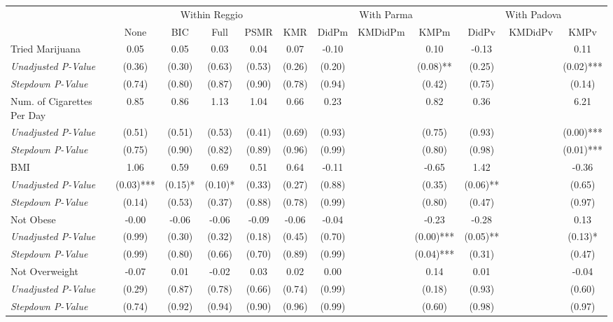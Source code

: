 \begin{tabular}{l c c c c c c c c c c c}
\toprule
& \multicolumn{5}{c}{Within Reggio} & \multicolumn{3}{c}{With Parma} & \multicolumn{3}{c}{With Padova} \\\cmidrule(lr){2-6} \cmidrule(lr){7-9} \cmidrule(lr){10-12}
 & None & BIC & Full & PSMR & KMR & DidPm & KMDidPm & KMPm & DidPv & KMDidPv & KMPv \\
\midrule
Tried Marijuana & 0.05 & 0.05 & 0.03 & 0.04 & 0.07 & -0.10 & & 0.10 & -0.13 & & 0.11 \\
\quad \textit{Unadjusted P-Value} & (0.36) & (0.30) & (0.63) & (0.53) & (0.26) & (0.20) & & (0.08)** & (0.25) & & (0.02)*** \\
\quad \textit{Stepdown P-Value} & (0.74) & (0.80) & (0.87) & (0.90) & (0.78) & (0.94) & & (0.42) & (0.75) & & (0.14) \\
Num. of Cigarettes Per Day & 0.85 & 0.86 & 1.13 & 1.04 & 0.66 & 0.23 & & 0.82 & 0.36 & & 6.21 \\
\quad \textit{Unadjusted P-Value} & (0.51) & (0.51) & (0.53) & (0.41) & (0.69) & (0.93) & & (0.75) & (0.93) & & (0.00)*** \\
\quad \textit{Stepdown P-Value} & (0.75) & (0.90) & (0.82) & (0.89) & (0.96) & (0.99) & & (0.80) & (0.98) & & (0.01)*** \\
BMI & 1.06 & 0.59 & 0.69 & 0.51 & 0.64 & -0.11 & & -0.65 & 1.42 & & -0.36 \\
\quad \textit{Unadjusted P-Value} & (0.03)*** & (0.15)* & (0.10)* & (0.33) & (0.27) & (0.88) & & (0.35) & (0.06)** & & (0.65) \\
\quad \textit{Stepdown P-Value} & (0.14) & (0.53) & (0.37) & (0.88) & (0.78) & (0.99) & & (0.80) & (0.47) & & (0.97) \\
Not Obese & -0.00 & -0.06 & -0.06 & -0.09 & -0.06 & -0.04 & & -0.23 & -0.28 & & 0.13 \\
\quad \textit{Unadjusted P-Value} & (0.99) & (0.30) & (0.32) & (0.18) & (0.45) & (0.70) & & (0.00)*** & (0.05)** & & (0.13)* \\
\quad \textit{Stepdown P-Value} & (0.99) & (0.80) & (0.66) & (0.70) & (0.89) & (0.99) & & (0.04)*** & (0.31) & & (0.47) \\
Not Overweight & -0.07 & 0.01 & -0.02 & 0.03 & 0.02 & 0.00 & & 0.14 & 0.01 & & -0.04 \\
\quad \textit{Unadjusted P-Value} & (0.29) & (0.87) & (0.78) & (0.66) & (0.74) & (0.99) & & (0.18) & (0.93) & & (0.60) \\
\quad \textit{Stepdown P-Value} & (0.74) & (0.92) & (0.94) & (0.90) & (0.96) & (0.99) & & (0.60) & (0.98) & & (0.97) \\

\end{tabular}
